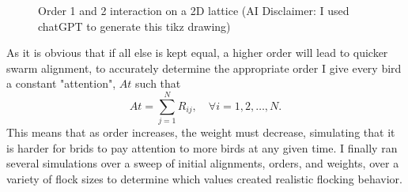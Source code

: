 \documentclass[11pt,a4paper]{article}
\numberwithin{equation}{section}
\theoremstyle{definition}
\theoremstyle{assumption}
\begin{document}
\begin{figure}[h]
    \caption{Order 1 and 2 interaction on a 2D lattice (AI Disclaimer: I used chatGPT to generate this tikz drawing)}
    \label{fig:order2-2d}
\end{figure}

As it is obvious that if all else is kept equal, a higher order will lead to quicker swarm alignment, to
accurately determine the appropriate order I give every bird a constant "attention", $At$ such that 
\begin{equation}
    At = \sum_{j=1}^N R_{ij}, \quad \forall i=1,2,\ldots,N.
\end{equation}   
This means that as order increases, the weight must decrease, simulating that it is harder
for brids to pay attention to more birds at any given time. I finally ran several simulations 
over a sweep of initial alignments, orders, and weights, over a variety 
of flock sizes to determine which values created realistic flocking behavior.

\end{document}
